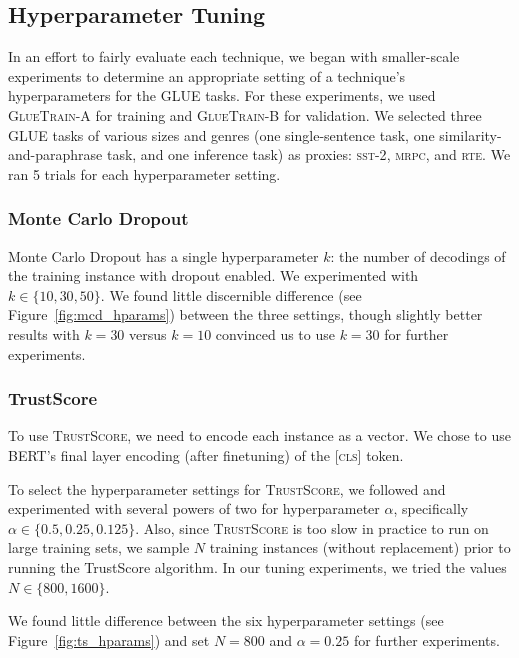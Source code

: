 \documentclass[11pt]{article}
\begin{document}
\subsection{Hyperparameter Tuning}

In an effort to fairly evaluate each technique, we began with smaller-scale experiments to determine an appropriate setting of a technique's hyperparameters for the \textsc{GLUE} tasks. For these experiments, we used \textsc{GlueTrain-A} for training and \textsc{GlueTrain-B} for validation. We selected three \textsc{GLUE} tasks of various sizes and genres (one single-sentence task, one similarity-and-paraphrase task, and one inference task) as proxies: \textsc{sst-2}, \textsc{mrpc}, and \textsc{rte}. We ran 5 trials for each hyperparameter setting.

\subsubsection*{Monte Carlo Dropout}

Monte Carlo Dropout has a single hyperparameter $k$: the number of decodings of the training instance with dropout enabled. We experimented with $k \in \{10, 30, 50\}$. We found little discernible difference (see Figure~\ref{fig:mcd_hparams}) between the three settings, though slightly better results with $k=30$ versus $k=10$ convinced us to use $k=30$ for further experiments.


\subsubsection*{TrustScore}

To use \textsc{TrustScore}, we need to encode each instance as a vector. We chose to use BERT's final layer encoding (after finetuning) of the \textsc{[cls]} token.

To select the hyperparameter settings for \textsc{TrustScore}, we followed \cite{jiang2018trust} and experimented with several powers of two for hyperparameter $\alpha$, specifically $\alpha \in \{0.5, 0.25, 0.125\}$. Also, since \textsc{TrustScore} is too slow in practice to run on large training sets, we sample $N$ training instances (without replacement) prior to running the TrustScore algorithm. In our tuning experiments, we tried the values $N \in \{800, 1600\}$. 

We found little difference between the six hyperparameter settings (see Figure~\ref{fig:ts_hparams}) and set $N=800$ and $\alpha=0.25$ for further experiments.
\end{document}
